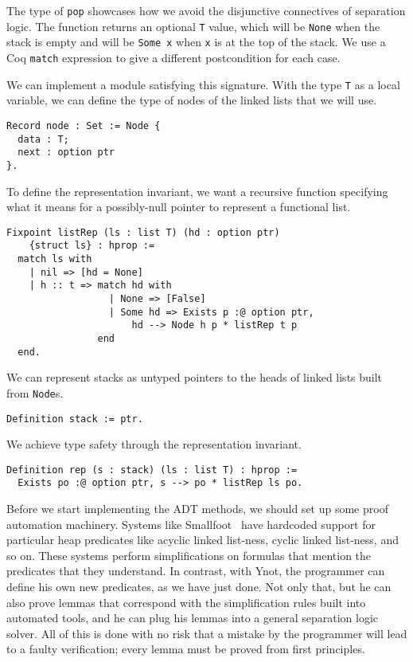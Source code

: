 \documentclass[preprint,nocopyrightspace]{sigplanconf}
\newcommand{\cd}[1]{\texttt{#1}}
\begin{document}
The type of \cd{pop} showcases how we avoid the disjunctive connectives of separation logic.  The function returns an optional \cd{T} value, which will be \cd{None} when the stack is empty and will be \cd{Some x} when \cd{x} is at the top of the stack.  We use a Coq \cd{match} expression to give a different postcondition for each case.

\medskip

We can implement a module satisfying this signature.  With the type \cd{T} as a local variable, we can define the type of nodes of the linked lists that we will use.

\begin{verbatim}
Record node : Set := Node {
  data : T;
  next : option ptr
}.
\end{verbatim}

To define the representation invariant, we want a recursive function specifying what it means for a possibly-null pointer to represent a functional list.

\begin{verbatim}
Fixpoint listRep (ls : list T) (hd : option ptr)
    {struct ls} : hprop :=
  match ls with
    | nil => [hd = None]
    | h :: t => match hd with
                  | None => [False]
                  | Some hd => Exists p :@ option ptr,
                      hd --> Node h p * listRep t p
                end
  end.
\end{verbatim}

We can represent stacks as untyped pointers to the heads of linked lists built from \cd{Node}s.

\begin{verbatim}
Definition stack := ptr.
\end{verbatim}

We achieve type safety through the representation invariant.

\begin{verbatim}
Definition rep (s : stack) (ls : list T) : hprop :=
  Exists po :@ option ptr, s --> po * listRep ls po.
\end{verbatim}

Before we start implementing the ADT methods, we should set up some proof automation machinery.  Systems like Smallfoot~\cite{smallfoot} have hardcoded support for particular heap predicates like acyclic linked list-ness, cyclic linked list-ness, and so on.  These systems perform simplifications on formulas that mention the predicates that they understand.  In contrast, with Ynot, the programmer can define his own new predicates, as we have just done.  Not only that, but he can also prove lemmas that correspond with the simplification rules built into automated tools, and he can plug his lemmas into a general separation logic solver.  All of this is done with no risk that a mistake by the programmer will lead to a faulty verification; every lemma must be proved from first principles.
\end{document}
